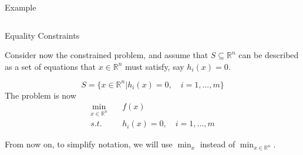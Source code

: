 \documentclass[aspectratio=169]{beamer}
\begin{document}
\begin{frame}{Example}
    \begin{columns}
        \begin{column}{0.47\textwidth}
            \begin{center}
            \end{center}
        \end{column}
        
        \pause
        
        \begin{column}{0.47\textwidth}
            \begin{center}
            \end{center}
        \end{column}
    \end{columns}
\end{frame}


\begin{frame}{Equality Constraints}

    Consider now the constrained problem, and assume that $S\subseteq\mathds{R}^n$ can be described as a set of equations that $x\in\mathds{R}^n$ must satisfy, say $h_i(x)=0$.
    
    $$S=\{x\in\mathds{R}^n|h_i(x)=0,\quad i=1,...,m\}$$
    The problem is now
    \begin{align*}
        \min_{x\in\mathds{R}^n}\quad &f(x)\\
        s.t.\quad &h_i(x)=0,\quad i=1,...,m
    \end{align*}


From now on, to simplify notation, we will use $\min_x$ instead of $\min_{x\in\mathds{R}^n}$.
\end{frame}
\end{document}
